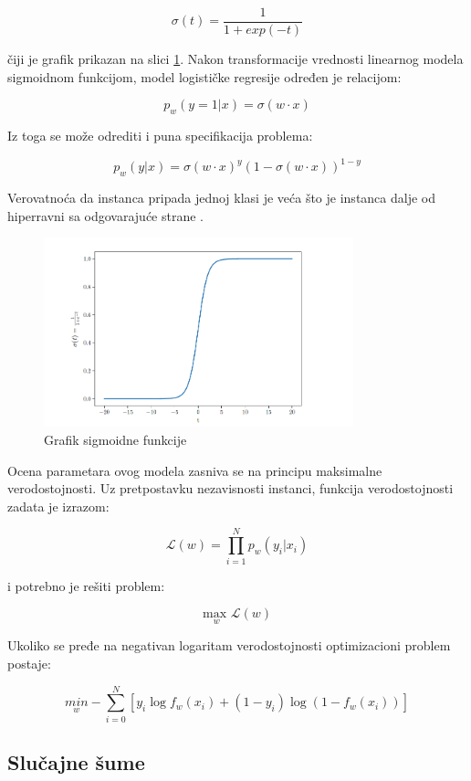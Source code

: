 $$\sigma(t) = \dfrac{1}{1+exp(-t)}$$

\noindent čiji je grafik prikazan na slici \ref{fig:sigmoid}. Nakon transformacije vrednosti linearnog modela sigmoidnom funkcijom, model logističke regresije određen je relacijom:

$$p_w(y = 1 | x) = \sigma(w \cdot x)$$


Iz toga se može odrediti i puna specifikacija problema:

$$p_w(y | x) = \sigma(w \cdot x)^y (1 - \sigma(w \cdot x))^{1-y}$$

Verovatnoća da instanca pripada jednoj klasi je veća što je instanca dalje od hiperravni sa odgovarajuće strane \cite{ml}.

\begin{figure}[h]
	\centering
	\includegraphics[width=0.8\textwidth]{Figures/sigmoid.png}
	\caption{Grafik sigmoidne funkcije \cite{ml}}
	\label{fig:sigmoid}
\end{figure}

Ocena parametara ovog modela zasniva se na principu maksimalne verodostojnosti. Uz pretpostavku nezavisnosti instanci, funkcija verodostojnosti zadata je izrazom:

$$\mathcal{L}(w) = \prod_{i=1}^{N}p_w(y_i|x_i)$$

i potrebno je rešiti problem:

$$\underset{w}{\text{max }}\mathcal{L}(w)$$

Ukoliko se pređe na negativan logaritam verodostojnosti optimizacioni problem postaje:

$$ \underset{w}{min} -\sum_{i=0}^{N} [y_i\log f_w(x_i) + (1-y_i)\log(1 - f_w(x_i))]$$



\subsection{Slučajne šume} 

